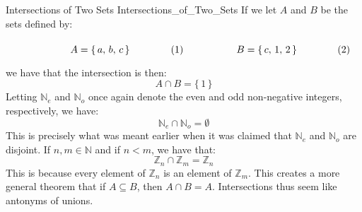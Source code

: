         \begin{fexample}{Intersections of Two Sets}
                        {Intersections_of_Two_Sets}
            If we let $A$ and $B$ be the sets defined by:
            \par\hfill\par
            \begin{subequations}
                \begin{minipage}[b]{0.49\textwidth}
                    \begin{equation}
                        A=\{\,a,\,b,\,c\,\}
                    \end{equation}
                \end{minipage}
                \hfill
                \begin{minipage}[b]{0.49\textwidth}
                    \begin{equation}
                        B=\{\,c,\,1,\,2\,\}
                    \end{equation}
                \end{minipage}
            \end{subequations}
            \par\vspace{2.5ex}
            we have that the intersection is then:
            \begin{equation}
                A\cap{B}=\{\,1\,\}
            \end{equation}
            Letting $\mathbb{N}_{e}$ and $\mathbb{N}_{o}$ once again denote
            the even and odd non-negative integers, respectively, we have:
            \begin{equation}
                \mathbb{N}_{e}\cap\mathbb{N}_{o}=\emptyset
            \end{equation}
            This is precisely what was meant earlier when it was claimed that
            $\mathbb{N}_{e}$ and $\mathbb{N}_{o}$ are disjoint. If
            $n,m\in\mathbb{N}$ and if $n<m$, we have that:
            \begin{equation}
                \mathbb{Z}_{n}\cap\mathbb{Z}_{m}=\mathbb{Z}_{n}
            \end{equation}
            This is because every element of $\mathbb{Z}_{n}$ is an element
            of $\mathbb{Z}_{m}$. This creates a more general theorem that if
            $A\subseteq{B}$, then $A\cap{B}=A$. Intersections thus seem like
            antonyms of unions.
        \end{fexample}
